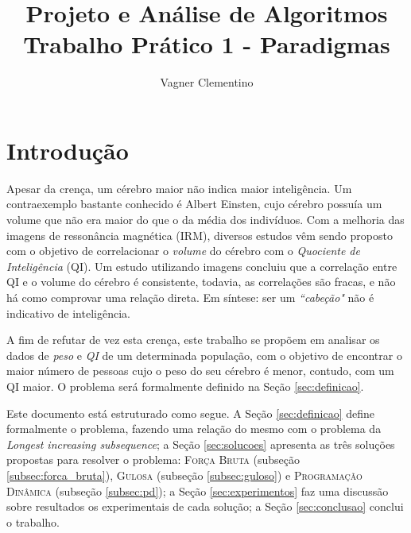 \documentclass[12pt]{article}
\title{Projeto e Análise de Algoritmos\\ Trabalho Prático 1 - Paradigmas}
\author{Vagner Clementino\inst{1}}
\begin{document}
 

\maketitle

     


\section{Introdução}
\label{sec:intro}

Apesar da crença, um cérebro maior não indica maior inteligência. Um contraexemplo bastante conhecido é Albert Einsten, cujo cérebro possuía um volume que não era maior do que o da média dos indivíduos. Com a melhoria das imagens de ressonância magnética (IRM), diversos estudos vêm sendo proposto com o objetivo de correlacionar o \textit{volume} do cérebro com o \textit{Quociente de Inteligência} (QI). Um estudo utilizando imagens concluiu que a correlação entre QI e o volume do cérebro é consistente, todavia, as correlações são fracas, e não há como comprovar uma relação direta. Em síntese: ser um \textit{``cabeção"} não é indicativo de inteligência.

A fim de refutar de vez esta crença, este trabalho se propõem em analisar os dados de \emph{peso} e \emph{QI} de um determinada população, com o objetivo de encontrar o maior número de pessoas cujo o peso do seu cérebro é menor, contudo, com um QI maior. O problema será formalmente definido na Seção \ref{sec:definicao}{}.

Este documento está estruturado como segue. A Seção \ref{sec:definicao} define formalmente o problema, fazendo uma relação do mesmo com o problema da \textit{Longest increasing subsequence}{}; a Seção \ref{sec:solucoes} apresenta as três soluções propostas para resolver o problema: \textsc{Força Bruta} (subseção \ref{subsec:forca_bruta}{}), \textsc{Gulosa} (subseção \ref{subsec:guloso}) e \textsc{Programação Dinâmica} (subseção \ref{subsec:pd}); a Seção \ref{sec:experimentos}{} faz uma discussão sobre resultados os experimentais de cada solução; a Seção \ref{sec:conclusao} conclui o trabalho.
\end{document}
